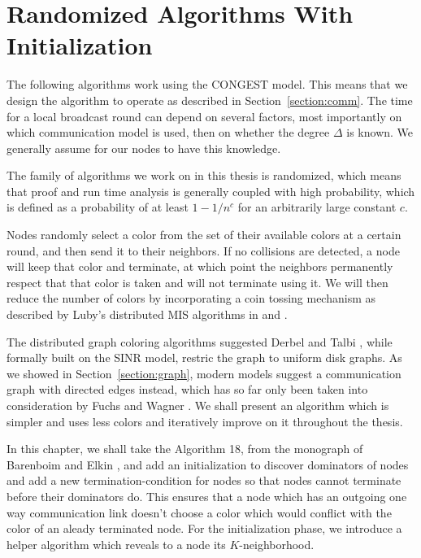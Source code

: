 \chapter{Randomized Algorithms With Initialization}
\label{ch:randomizedAlgorithms}

The following algorithms work using the CONGEST model. This means that we design the algorithm to operate as described in Section~\ref{section:comm}. The time for a local broadcast round can depend on several factors, most importantly on which communication model is used, then on whether the degree $\Delta$ is known. We generally assume for our nodes to have this knowledge.

The family of algorithms we work on in this thesis is randomized, which means that proof and run time analysis is generally coupled with high probability, which is defined as a probability of at least $1-1/n^c$ for an arbitrarily large constant $c$.

Nodes randomly select a color from the set of their available colors at a certain round, and then send it to their neighbors. If no collisions are detected, a node will keep that color and terminate, at which point the neighbors permanently respect that that color is taken and will not terminate using it. We will then reduce the number of colors by incorporating a coin tossing mechanism as described by Luby's distributed MIS algorithms in \cite{luby1986simple} and \cite{luby1988removing}.

The distributed graph coloring algorithms suggested Derbel and Talbi \cite{dt-dncsi-10}, while formally built on the SINR model, restric the graph to uniform disk graphs. As we showed in Section~\ref{section:graph}, modern models suggest a communication graph with directed edges instead, which has so far only been taken into consideration by Fuchs and Wagner \cite{DBLP:journals/corr/FuchsW14}. We shall present an algorithm which is simpler and uses less colors and iteratively improve on it throughout the thesis.

In this chapter, we shall take the Algorithm 18, from the monograph of Barenboim and Elkin \cite[p. 101]{be-dcg-13}, and add an initialization to discover dominators of nodes and add a new termination-condition for nodes so that nodes cannot terminate before their dominators do. This ensures that a node which has an outgoing one way communication link doesn't choose a color which would conflict with the color of an aleady terminated node. For the initialization phase, we introduce a helper algorithm which reveals to a node its $K$-neighborhood.


